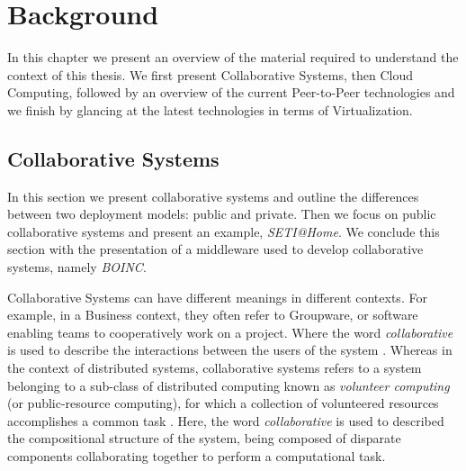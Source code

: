 \documentclass[12pt, titlepage]{uo_temp}
\begin{document}
     \chapter{Background}
     In this chapter we present an overview of the material required to understand the
     context of this thesis. We first present Collaborative Systems, then
     Cloud Computing, followed by an overview of the current Peer-to-Peer technologies and
     we finish by glancing at the latest technologies in terms of Virtualization.

     \section{Collaborative Systems}\label{bkg_collab}
     In this section we present collaborative systems and outline the differences between
     two deployment models: public and private. Then we focus on public collaborative
     systems and present an example, \emph{SETI@Home}. We conclude this section with the
     presentation of a middleware used to develop collaborative systems, namely
     \emph{BOINC}.

     Collaborative Systems can have different meanings in different contexts. For example,
     in a Business context, they often refer to Groupware, or software enabling teams to
     cooperatively work on a project. Where the word \emph{collaborative} is used to
     describe the interactions between the users of the system
     \cite{carstensen1999computer}.
     Whereas in the context of distributed systems, collaborative systems refers to a
     system belonging to a sub-class of distributed computing known as \emph{volunteer
       computing} (or public-resource computing), for which a collection of volunteered
     resources accomplishes a common task \cite{anderson2006computational}. Here, the word
     \emph{collaborative} is used to described the compositional structure of the system,
     being composed of disparate components collaborating together to perform a
     computational task.
\end{document}
